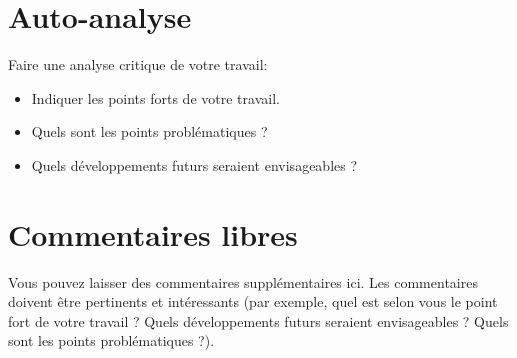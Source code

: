 \documentclass[a4paper, 11pt]{article}
\begin{document}
\section{Auto-analyse}

Faire une analyse critique de votre travail:\\
\begin{itemize}
\item Indiquer les points forts de votre travail.
\vspace{1cm}
\item Quels sont les points problématiques ?
\vspace{1cm}
\item Quels développements futurs seraient envisageables ?
\vspace{1cm}
\end{itemize}


\section{Commentaires libres}

Vous pouvez laisser des commentaires supplémentaires ici. Les commentaires
doivent être pertinents et intéressants (par exemple, quel est selon vous
le point fort de votre travail ? Quels développements futurs seraient
envisageables ? Quels sont les points problématiques ?).
\end{document}
